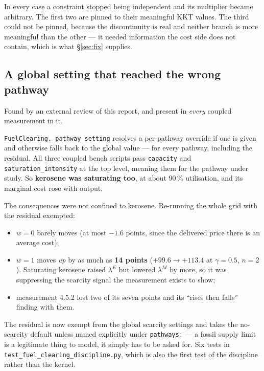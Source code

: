 \documentclass[11pt,a4paper]{article}
\newcommand{\var}[1]{\texttt{\small #1}}
\begin{document}
\noindent In every case a constraint stopped being independent and its multiplier became
arbitrary. The first two are pinned to their meaningful KKT values. The third could not
be pinned, because the discontinuity is real and neither branch is more meaningful than
the other --- it needed information the cost side does not contain, which is what
\S\ref{sec:fix} supplies.

\subsection{A global setting that reached the wrong pathway}
\label{sec:kerosene}

Found by an external review of this report, and present in \emph{every} coupled
measurement in it.

\var{FuelClearing.\_pathway\_setting} resolves a per-pathway override if one is given and
otherwise falls back to the global value --- for every pathway, including the residual.
All three coupled bench scripts pass \var{capacity} and \var{saturation\_intensity} at
the top level, meaning them for the pathway under study. So \textbf{kerosene was
saturating too}, at about 90\,\% utilisation, and its marginal cost rose with output.

The consequences were not confined to kerosene. Re-running the whole grid with the
residual exempted:

\begin{itemize}[nosep,leftmargin=5mm]
  \item $w=0$ barely moves (at most $-1.6$ points, since the delivered price there is an
        average cost);
  \item $w=1$ moves \emph{up} by as much as \textbf{14 points} ($+99.6 \to +113.4$ at
        $\gamma=0.5$, $n=2$). Saturating kerosene raised $\lambda^{E}$ but lowered
        $\lambda^{M}$ by more, so it was suppressing the scarcity signal the measurement
        exists to show;
  \item measurement 4.5.2 lost two of its seven points and its ``rises then falls''
        finding with them.
\end{itemize}

The residual is now exempt from the global scarcity settings and takes the no-scarcity
default unless named explicitly under \var{pathways:} --- a fossil supply limit is a
legitimate thing to model, it simply has to be asked for. Six tests in
\var{test\_fuel\_clearing\_discipline.py}, which is also the first test of the discipline
rather than the kernel.
\end{document}
